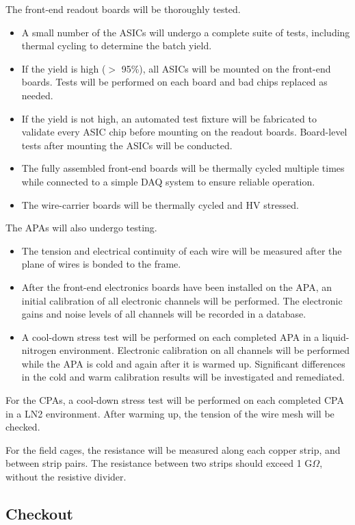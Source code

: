 The front-end readout boards will be thoroughly tested.
\begin{itemize}
\item A small number of the ASICs will undergo a complete suite 
of tests, including thermal cycling to determine the batch yield.
\item If the yield is high ($>$ 95\%), all ASICs will be mounted 
on the front-end boards.  Tests will be performed on each board  
and bad chips replaced as needed.
\item If the yield is not high, an automated test fixture will be 
fabricated to validate every ASIC chip before mounting on the 
readout boards.  Board-level tests after mounting the
ASICs will be conducted.
\item The fully assembled front-end boards will be thermally cycled multiple times while connected to a simple DAQ system to ensure reliable operation.
\item The wire-carrier boards will be thermally cycled and HV stressed.
\end{itemize}

The APAs will also undergo testing.
\begin{itemize}
\item The tension and electrical continuity of each wire will be 
measured after the plane of wires is bonded to the frame.
\item After the front-end electronics boards have been installed on 
the APA, an initial calibration of all electronic channels will be 
performed.  The electronic gains and noise levels of all channels will be 
recorded in a database.
\item A cool-down stress test will be performed on each completed 
APA in a liquid-nitrogen environment.  Electronic calibration on 
all channels will be performed while the APA is cold and again
after it is warmed up.  Significant differences in the cold and warm calibration 
results will be investigated and remediated.  
\end{itemize}

For the CPAs, a cool-down stress test will be performed on each completed 
CPA in a LN2 environment.  After warming up, 
 the tension of the wire mesh will be checked.


For the field cages,  the resistance will be measured along each copper strip,  
and between strip pairs.  The resistance between two 
strips should exceed 1 G$\Omega$, without the resistive divider. 

\subsection{Checkout } 
\label{sec:v5-tpc-checkout-checkout}

